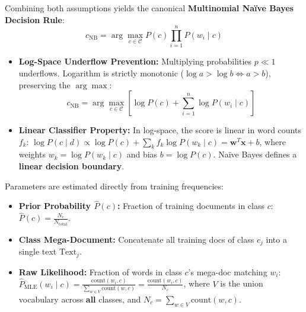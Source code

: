 \documentclass[10pt,a4paper]{article}
\begin{document}
\vspace{2pt}
Combining both assumptions yields the canonical \textbf{Multinomial Naïve Bayes Decision Rule}:
\[
c_{\text{NB}} = \arg\max_{c \in \mathcal{C}} P(c) \prod_{i=1}^n P(w_i \mid c)
\]

\vspace{-2pt}

\par\vspace{1pt}
\begin{itemize}[leftmargin=12pt, itemsep=0.5pt, parsep=0pt, topsep=0.5pt]
    \item \textbf{Log-Space Underflow Prevention:} Multiplying probabilities $p \ll 1$ underflows. Logarithm is strictly monotonic ($\log a > \log b \iff a > b$), preserving the $\arg\max$:
    \[
    c_{\text{NB}} = \arg\max_{c \in \mathcal{C}} \left[ \log P(c) + \sum_{i=1}^n \log P(w_i \mid c) \right]
    \]
    \item \textbf{Linear Classifier Property:} In log-space, the score is linear in word counts $f_k$: $\log P(c \mid d) \propto \log P(c) + \sum_{k} f_k \log P(w_k \mid c) = \mathbf{w}^T \mathbf{x} + b$, where weights $w_k = \log P(w_k \mid c)$ and bias $b = \log P(c)$. Naïve Bayes defines a \textbf{linear decision boundary}.
\end{itemize}

\newpage


\par\vspace{1pt}
Parameters are estimated directly from training frequencies:
\begin{itemize}[leftmargin=12pt, itemsep=0.5pt, parsep=0pt, topsep=0.5pt]
    \item \textbf{Prior Probability $\hat{P}(c)$:} Fraction of training documents in class $c$: $\hat{P}(c) = \frac{N_c}{N_{\text{total}}}$.
    \item \textbf{Class Mega-Document:} Concatenate all training docs of class $c_j$ into a single text $\text{Text}_j$.
    \item \textbf{Raw Likelihood:} Fraction of words in class $c$'s mega-doc matching $w_i$: $\hat{P}_{\text{MLE}}(w_i \mid c) = \frac{\text{count}(w_i, c)}{\sum_{w \in V} \text{count}(w, c)} = \frac{\text{count}(w_i, c)}{N_c}$, where $V$ is the union vocabulary across \textbf{all} classes, and $N_c = \sum_{w \in V} \text{count}(w, c)$.
\end{itemize}
\end{document}
